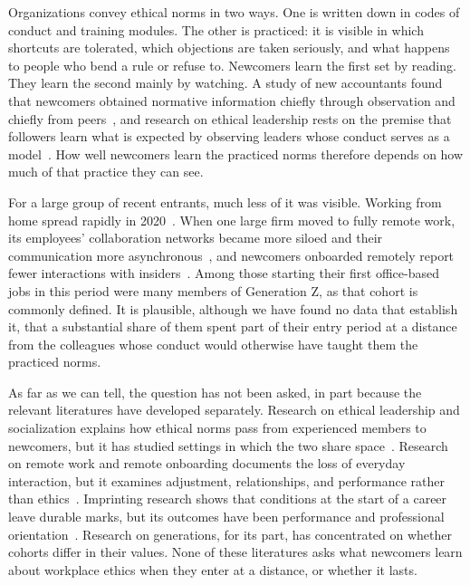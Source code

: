 Organizations convey ethical norms in two ways. One is written down in codes of conduct and training modules. The other is practiced: it is visible in which shortcuts are tolerated, which objections are taken seriously, and what happens to people who bend a rule or refuse to. Newcomers learn the first set by reading. They learn the second mainly by watching. A study of new accountants found that newcomers obtained normative information chiefly through observation and chiefly from peers~\citep{morrison1993newcomer}, and research on ethical leadership rests on the premise that followers learn what is expected by observing leaders whose conduct serves as a model~\citep{brown2005ethical}. How well newcomers learn the practiced norms therefore depends on how much of that practice they can see.

For a large group of recent entrants, much less of it was visible. Working from home spread rapidly in 2020~\citep{kniffin2021covid}. When one large firm moved to fully remote work, its employees' collaboration networks became more siloed and their communication more asynchronous~\citep{yang2022effects}, and newcomers onboarded remotely report fewer interactions with insiders~\citep{paik2026membership}. Among those starting their first office-based jobs in this period were many members of Generation Z, as that cohort is commonly defined. It is plausible, although we have found no data that establish it, that a substantial share of them spent part of their entry period at a distance from the colleagues whose conduct would otherwise have taught them the practiced norms.

As far as we can tell, the question has not been asked, in part because the relevant literatures have developed separately. Research on ethical leadership and socialization explains how ethical norms pass from experienced members to newcomers, but it has studied settings in which the two share space~\citep{brown2005ethical}. Research on remote work and remote onboarding documents the loss of everyday interaction, but it examines adjustment, relationships, and performance rather than ethics~\citep{paik2026membership}. Imprinting research shows that conditions at the start of a career leave durable marks, but its outcomes have been performance and professional orientation~\citep{tilcsik2014imprint}. Research on generations, for its part, has concentrated on whether cohorts differ in their values. None of these literatures asks what newcomers learn about workplace ethics when they enter at a distance, or whether it lasts.


